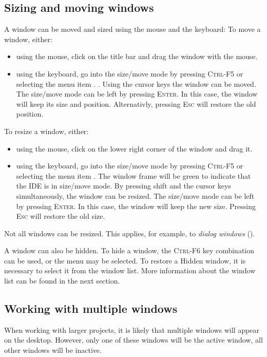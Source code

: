 \subsection{Sizing and moving windows}
\label{se:windowsizingmoving}
A window can be moved and sized using the mouse and the keyboard:
To move a window, either:
\begin{itemize}
\item using the mouse, click on the title bar and drag the window 
with the mouse.
\item using the keyboard, go into the size/move mode
by pressing \textsc{Ctrl-F5} or selecting the menu item
. . Using the cursor keys the window can be moved. 
The size/move mode can be left by pressing \textsc{Enter}. 
In this case, the window will keep its size and position. 
Alternativly, pressing \textsc{Esc} will restore the old position.
\end{itemize} 
To resize a window, either:
\begin{itemize}
\item using the mouse, click on the lower right corner of the window
and drag it.
\item using the keyboard, go into the size/move mode
by pressing \textsc{Ctrl-F5} or selecting the menu item
. The window frame will be green to indicate that
the IDE is in size/move mode. 
By pressing shift and the cursor keys simultaneously, the window can 
be resized.  The size/move mode can be left by pressing
\textsc{Enter}. In this case, the window will keep the new size.
Pressing \textsc{Esc} will restore the old size.
\end{itemize}
Not all windows can be resized. This applies, for example, to
\emph{dialog windows} ().

A window can also be hidden. To hide a window, the \textsc{Ctrl-F6} key
combination can be used, or the  menu may be selected.
To restore a Hidden window, it is necessary to select it from the window
list. More information about the window list can be found in the next
section.   
%
%
\subsection{Working with multiple windows}
\label{se:multiplewindows}
When working with larger projects, it is likely that multiple windows 
will appear on the desktop. However, only one of these windows will be 
the active window, all other windows will be inactive.

